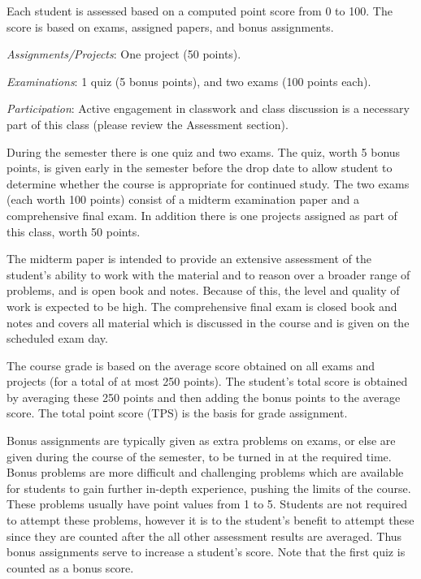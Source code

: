 Each student is assessed based on a computed point score from 0 to 100. The
score is based on exams, assigned papers, and bonus assignments.
\begin{compactenum}
\item
\textit{Assignments/Projects}: One project (50 points).
\item
\textit{Examinations}: 1 quiz (5 bonus points), and two exams (100 points each).
\item
\textit{Participation}: Active engagement in classwork and class discussion
is a necessary part of this class (please review the Assessment section).
\end{compactenum}

During the semester there is one quiz and two exams.
The quiz, worth 5 bonus points, is
given early in the semester before the drop date to allow student to determine
whether the course is appropriate for continued study.
The two exams (each worth 100 points) consist of a
midterm examination paper and a comprehensive final exam.
In addition there is one projects assigned as part of this class,
worth 50 points.

The midterm paper is intended to provide an extensive assessment of the
student's ability to work with the material and to reason over a broader
range of problems, and is open book and notes.
Because of this, the level and quality of work is expected to be high.
The comprehensive final exam is closed book and notes
and covers all material which is discussed in the
course and is given on the scheduled exam day.

The course grade is based on the
average score obtained on all exams and projects (for a
total of at most 250 points). The student's total score is obtained by
averaging these 250 points and then adding the bonus points
to the average score. The total point  score (TPS) is the basis for grade
assignment.

Bonus assignments are typically given as extra problems on exams,
or else are given during the course of
the semester, to be turned in at the required time. Bonus problems are more
difficult and challenging problems which are available for students to gain
further in-depth experience, pushing the limits of the course.
These problems usually have point values from 1 to 5. Students are
not required to attempt these problems, however it is to the student's benefit
to attempt these since they are counted after the all other assessment
results are averaged. Thus bonus assignments serve to increase a
student's score. Note that the first quiz is counted as a bonus score.


